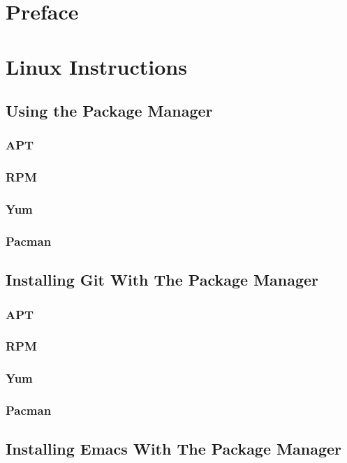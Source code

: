 \documentclass[a4paper]{article}
\begin{document}

\tableofcontents


\section*{Preface}

\section{Linux Instructions}
\subsection{Using the Package Manager}
\subsubsection*{APT}
\subsubsection*{RPM}
\subsubsection*{Yum}
\subsubsection*{Pacman}

\subsection{Installing Git With The Package Manager}
\subsubsection*{APT}
\subsubsection*{RPM}
\subsubsection*{Yum}
\subsubsection*{Pacman}

\subsection{Installing Emacs With The Package Manager}
\end{document}
